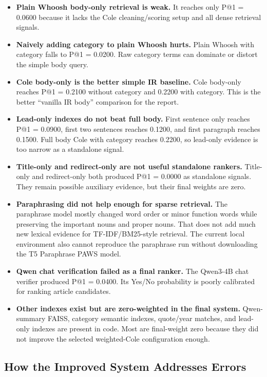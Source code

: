 \documentclass[11pt]{article}
\begin{document}
\begin{itemize}[leftmargin=*]
  \item \textbf{Plain Whoosh body-only retrieval is weak.} It reaches only P@1 = 0.0600 because it lacks the Cole cleaning/scoring setup and all dense retrieval signals.
  \item \textbf{Naively adding category to plain Whoosh hurts.} Plain Whoosh with category falls to P@1 = 0.0200. Raw category terms can dominate or distort the simple body query.
  \item \textbf{Cole body-only is the better simple IR baseline.} Cole body-only reaches P@1 = 0.2100 without category and 0.2200 with category. This is the better ``vanilla IR body'' comparison for the report.
  \item \textbf{Lead-only indexes do not beat full body.} First sentence only reaches P@1 = 0.0900, first two sentences reaches 0.1200, and first paragraph reaches 0.1500. Full body Cole with category reaches 0.2200, so lead-only evidence is too narrow as a standalone signal.
  \item \textbf{Title-only and redirect-only are not useful standalone rankers.} Title-only and redirect-only both produced P@1 = 0.0000 as standalone signals. They remain possible auxiliary evidence, but their final weights are zero.
  \item \textbf{Paraphrasing did not help enough for sparse retrieval.} The paraphrase model mostly changed word order or minor function words while preserving the important nouns and proper nouns. That does not add much new lexical evidence for TF-IDF/BM25-style retrieval. The current local environment also cannot reproduce the paraphrase run without downloading the T5 Paraphrase PAWS model.
  \item \textbf{Qwen chat verification failed as a final ranker.} The Qwen3-4B chat verifier produced P@1 = 0.0400. Its Yes/No probability is poorly calibrated for ranking article candidates.
  \item \textbf{Other indexes exist but are zero-weighted in the final system.} Qwen-summary FAISS, category semantic indexes, quote/year matches, and lead-only indexes are present in code. Most are final-weight zero because they did not improve the selected weighted-Cole configuration enough.
\end{itemize}

\subsection{How the Improved System Addresses Errors}
\end{document}
